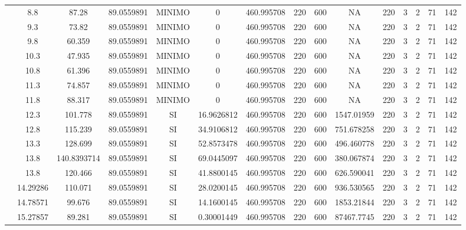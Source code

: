 \begin{table}[H]
{\begin{tabular}{|c|c|c|c|c|c|c|c|c|c|c|c|c|c|c|}
\cline{2-15}    & 8.8 & 87.28 & 89.0559891 & MINIMO & 0   & 460.995708 & 220 & 600 & NA  & 220 & 3   & 2   & 71  & 142 \bigstrut\\
\cline{2-15}    & 9.3 & 73.82 & 89.0559891 & MINIMO & 0   & 460.995708 & 220 & 600 & NA  & 220 & 3   & 2   & 71  & 142 \bigstrut\\
\cline{2-15}    & 9.8 & 60.359 & 89.0559891 & MINIMO & 0   & 460.995708 & 220 & 600 & NA  & 220 & 3   & 2   & 71  & 142 \bigstrut\\
\cline{2-15}    & 10.3 & 47.935 & 89.0559891 & MINIMO & 0   & 460.995708 & 220 & 600 & NA  & 220 & 3   & 2   & 71  & 142 \bigstrut\\
\cline{2-15}    & 10.8 & 61.396 & 89.0559891 & MINIMO & 0   & 460.995708 & 220 & 600 & NA  & 220 & 3   & 2   & 71  & 142 \bigstrut\\
\cline{2-15}    & 11.3 & 74.857 & 89.0559891 & MINIMO & 0   & 460.995708 & 220 & 600 & NA  & 220 & 3   & 2   & 71  & 142 \bigstrut\\
\cline{2-15}    & 11.8 & 88.317 & 89.0559891 & MINIMO & 0   & 460.995708 & 220 & 600 & NA  & 220 & 3   & 2   & 71  & 142 \bigstrut\\
\cline{2-15}    & 12.3 & 101.778 & 89.0559891 & SI  & 16.9626812 & 460.995708 & 220 & 600 & 1547.01959 & 220 & 3   & 2   & 71  & 142 \bigstrut\\
\cline{2-15}    & 12.8 & 115.239 & 89.0559891 & SI  & 34.9106812 & 460.995708 & 220 & 600 & 751.678258 & 220 & 3   & 2   & 71  & 142 \bigstrut\\
\cline{2-15}    & 13.3 & 128.699 & 89.0559891 & SI  & 52.8573478 & 460.995708 & 220 & 600 & 496.460778 & 220 & 3   & 2   & 71  & 142 \bigstrut\\
\cline{2-15}    & 13.8 & 140.8393714 & 89.0559891 & SI  & 69.0445097 & 460.995708 & 220 & 600 & 380.067874 & 220 & 3   & 2   & 71  & 142 \bigstrut\\
\cline{2-15}    & 13.8 & 120.466 & 89.0559891 & SI  & 41.8800145 & 460.995708 & 220 & 600 & 626.590041 & 220 & 3   & 2   & 71  & 142 \bigstrut\\
\cline{2-15}    & 14.29286 & 110.071 & 89.0559891 & SI  & 28.0200145 & 460.995708 & 220 & 600 & 936.530565 & 220 & 3   & 2   & 71  & 142 \bigstrut\\
\cline{2-15}    & 14.78571 & 99.676 & 89.0559891 & SI  & 14.1600145 & 460.995708 & 220 & 600 & 1853.21844 & 220 & 3   & 2   & 71  & 142 \bigstrut\\
\cline{2-15}    & 15.27857 & 89.281 & 89.0559891 & SI  & 0.30001449 & 460.995708 & 220 & 600 & 87467.7745 & 220 & 3   & 2   & 71  & 142 \bigstrut\\

\end{tabular}}
\end{table}
